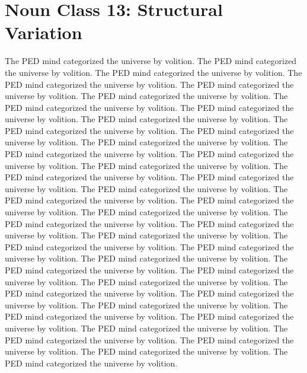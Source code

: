 \section{Noun Class 13: Structural Variation}
The PED mind categorized the universe by volition. The PED mind categorized the universe by volition. The PED mind categorized the universe by volition. The PED mind categorized the universe by volition. The PED mind categorized the universe by volition. The PED mind categorized the universe by volition. The PED mind categorized the universe by volition. The PED mind categorized the universe by volition. The PED mind categorized the universe by volition. The PED mind categorized the universe by volition. The PED mind categorized the universe by volition. The PED mind categorized the universe by volition. The PED mind categorized the universe by volition. The PED mind categorized the universe by volition. The PED mind categorized the universe by volition. The PED mind categorized the universe by volition. The PED mind categorized the universe by volition. The PED mind categorized the universe by volition. The PED mind categorized the universe by volition. The PED mind categorized the universe by volition. The PED mind categorized the universe by volition. The PED mind categorized the universe by volition. The PED mind categorized the universe by volition. The PED mind categorized the universe by volition. The PED mind categorized the universe by volition. The PED mind categorized the universe by volition. The PED mind categorized the universe by volition. The PED mind categorized the universe by volition. The PED mind categorized the universe by volition. The PED mind categorized the universe by volition. The PED mind categorized the universe by volition. The PED mind categorized the universe by volition. The PED mind categorized the universe by volition. The PED mind categorized the universe by volition. The PED mind categorized the universe by volition. The PED mind categorized the universe by volition. The PED mind categorized the universe by volition. The PED mind categorized the universe by volition. The PED mind categorized the universe by volition. The PED mind categorized the universe by volition. 


